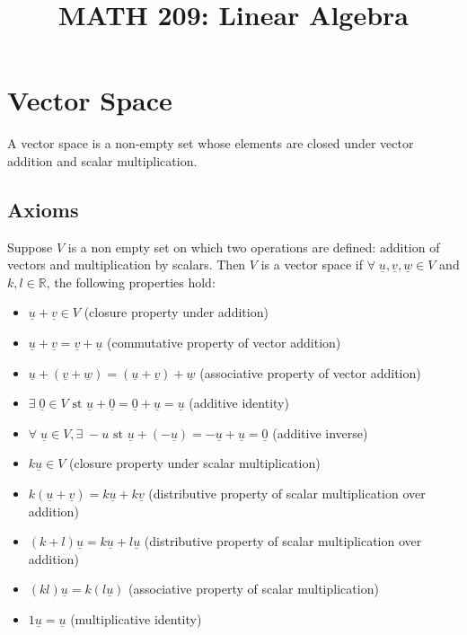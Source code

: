 \documentclass{article}
\title{MATH 209: Linear Algebra}
\author{}
\date{}
\begin{document}
\maketitle
\tableofcontents

\break

\section{Vector Space}

A vector space is a non-empty set whose elements are closed under vector addition and scalar multiplication.

\subsection{Axioms}

Suppose $V$ is a non empty set on which two operations are defined: addition of vectors and multiplication by scalars. Then $V$ is a vector space if $\forall \; \underline{u}, \underline{v}, \underline{w} \in V$ and $k,l \in \mathbb{R}$, the following properties hold:
\begin{itemize}
	\item $\underline{u} + \underline{v} \in V$ (closure property under addition)
	\item $\underline{u} + \underline{v} = \underline{v} + \underline{u}$ (commutative property of vector addition)
	\item $\underline{u} + (\underline{v} + \underline{w}) = (\underline{u} + \underline{v}) + \underline{w}$ (associative property of vector addition)
	\item $\exists \; \underline{0} \in V \text{ st } \underline{u} + \underline{0} = \underline{0} + \underline{u} = \underline{u}$ (additive identity)
	\item $\forall \; \underline{u} \in V, \exists \; -u \text{ st } \underline{u} + (-\underline{u}) = -\underline{u} + \underline{u} = \underline{0}$ (additive inverse)
	\item $k\underline{u} \in V$ (closure property under scalar multiplication)
	\item $k(\underline{u} + \underline{v}) = k\underline{u} + k\underline{v}$ (distributive property of scalar multiplication over addition)
	\item $(k+l)\underline{u} = k\underline{u} + l\underline{u}$ (distributive property of scalar multiplication over addition)
	\item $(kl)\underline{u} = k(l\underline{u})$ (associative property of scalar multiplication)
	\item $1\underline{u} = \underline{u}$ (multiplicative identity)
\end{itemize}
\end{document}
